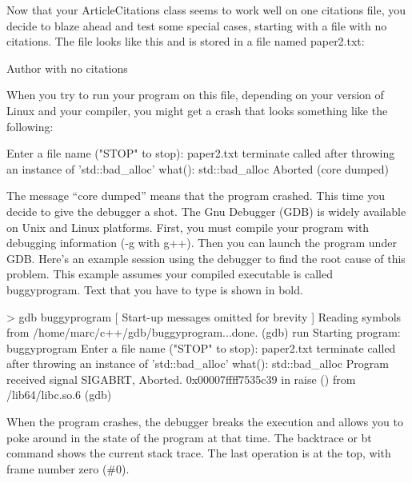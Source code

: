 Now that your ArticleCitations class seems to work well on one citations file, you decide to blaze ahead and test some special cases, starting with a file with no citations. The file looks like this and is stored in a file named paper2.txt:

\begin{shell}
Author with no citations
\end{shell}

When you try to run your program on this file, depending on your version of Linux and your compiler, you might get a crash that looks something like the following:

\begin{shell}
Enter a file name ("STOP" to stop): paper2.txt
terminate called after throwing an instance of 'std::bad_alloc'
    what(): std::bad_alloc
Aborted (core dumped)
\end{shell}

The message “core dumped” means that the program crashed. This time you decide to give the debugger a shot. The Gnu Debugger (GDB) is widely available on Unix and Linux platforms. First, you must compile your program with debugging information (-g with g++). Then you can launch the program under GDB. Here’s an example session using the debugger to find the root cause of this problem. This example assumes your compiled executable is called buggyprogram. Text that you have to type is shown in bold.

\begin{shell}
> gdb buggyprogram
[ Start-up messages omitted for brevity ]
Reading symbols from /home/marc/c++/gdb/buggyprogram...done.
(gdb) run
Starting program: buggyprogram
Enter a file name ("STOP" to stop): paper2.txt
terminate called after throwing an instance of 'std::bad_alloc'
    what(): std::bad_alloc
Program received signal SIGABRT, Aborted.
0x00007ffff7535c39 in raise () from /lib64/libc.so.6
(gdb)
\end{shell}

When the program crashes, the debugger breaks the execution and allows you to poke around in the state of the program at that time. The backtrace or bt command shows the current stack trace. The last operation is at the top, with frame number zero (\#0).


